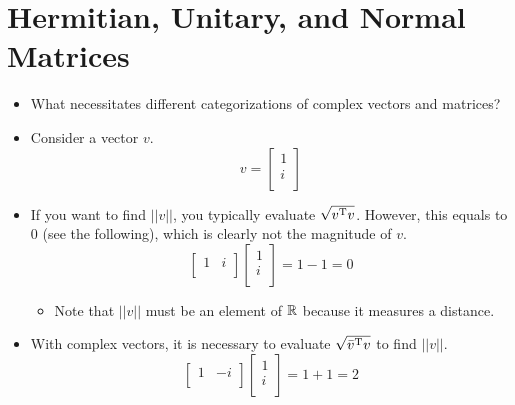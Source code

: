 \documentclass{article}
\begin{document}
\section*{Hermitian, Unitary, and Normal Matrices}
\begin{itemize}
    \item {}What necessitates different categorizations of complex vectors and matrices?
    \item Consider a vector $v$.
    \begin{equation*}
        v =
        \begin{bmatrix}
            1\\
            i\\
        \end{bmatrix}
    \end{equation*}
    \item If you want to find $||v||$, you typically evaluate $\sqrt{v^{\text{T}} v}$. However, this equals to 0 (see the following), which is clearly not the magnitude of $v$.
    \begin{equation*}
        \begin{bmatrix}
            1 & i\\
        \end{bmatrix}
        \begin{bmatrix}
            1\\
            i\\
        \end{bmatrix}
        = 1-1 = 0
    \end{equation*}
    \begin{itemize}
        \item Note that $||v||$ must be an element of $\mathbb{R}$ because it measures a distance.
    \end{itemize}
    \item With complex vectors, it is necessary to evaluate $\sqrt{\bar{v}^{\text{T}} v}$ to find $||v||$.
    \begin{equation*}
        \begin{bmatrix}
            1 & -i\\
        \end{bmatrix}
        \begin{bmatrix}
            1\\
            i\\
        \end{bmatrix}
        = 1+1 = 2
    \end{equation*}
    \begin{equation*}

\end{equation*}
\end{itemize}
\end{document}
